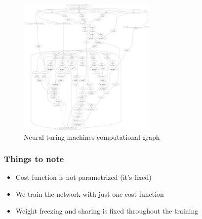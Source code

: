 \documentclass{beamer}
\begin{document}
\begin{frame}
	\begin{figure}[h!]
	\centering
	\includegraphics[width=0.6\textwidth]{ntm_comp_graph.jpg}
	\caption{Neural turing machines computational graph}
	\label{fig:ntm_comp_graph}
	\end{figure}

\end{frame}
\begin{frame}
	\frametitle{Things to note}
	\begin{itemize}
		\item Cost function is not parametrized (it's fixed)
		\item We train the network with just one cost function
		\item Weight freezing and sharing is fixed throughout the training
	\end{itemize}
\end{frame}
\end{document}
